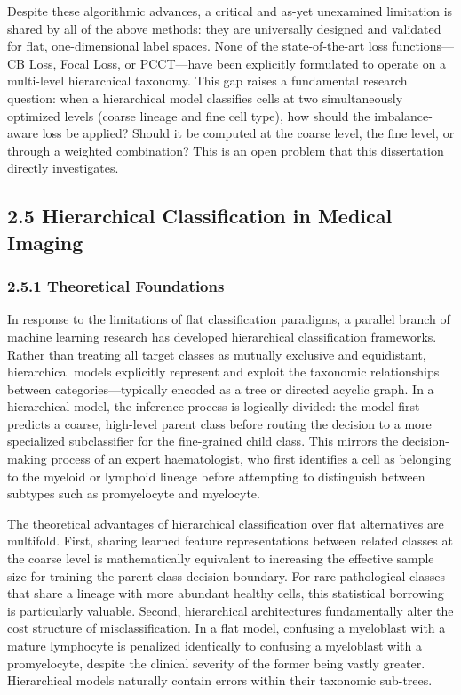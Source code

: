 \documentclass[11pt]{article}
\begin{document}
Despite these algorithmic advances, a critical and as-yet unexamined limitation is shared by all of the above methods: they are universally designed and validated for flat, one-dimensional label spaces. None of the state-of-the-art loss functions—CB Loss, Focal Loss, or PCCT—have been explicitly formulated to operate on a multi-level hierarchical taxonomy. This gap raises a fundamental research question: when a hierarchical model classifies cells at two simultaneously optimized levels (coarse lineage and fine cell type), how should the imbalance-aware loss be applied? Should it be computed at the coarse level, the fine level, or through a weighted combination? This is an open problem that this dissertation directly investigates.

\subsection*{2.5 Hierarchical Classification in Medical Imaging}

\subsubsection*{2.5.1 Theoretical Foundations}

In response to the limitations of flat classification paradigms, a parallel branch of machine learning research has developed hierarchical classification frameworks. Rather than treating all target classes as mutually exclusive and equidistant, hierarchical models explicitly represent and exploit the taxonomic relationships between categories—typically encoded as a tree or directed acyclic graph. In a hierarchical model, the inference process is logically divided: the model first predicts a coarse, high-level parent class before routing the decision to a more specialized subclassifier for the fine-grained child class. This mirrors the decision-making process of an expert haematologist, who first identifies a cell as belonging to the myeloid or lymphoid lineage before attempting to distinguish between subtypes such as promyelocyte and myelocyte.

The theoretical advantages of hierarchical classification over flat alternatives are multifold. First, sharing learned feature representations between related classes at the coarse level is mathematically equivalent to increasing the effective sample size for training the parent-class decision boundary. For rare pathological classes that share a lineage with more abundant healthy cells, this statistical borrowing is particularly valuable. Second, hierarchical architectures fundamentally alter the cost structure of misclassification. In a flat model, confusing a myeloblast with a mature lymphocyte is penalized identically to confusing a myeloblast with a promyelocyte, despite the clinical severity of the former being vastly greater. Hierarchical models naturally contain errors within their taxonomic sub-trees.
\end{document}
